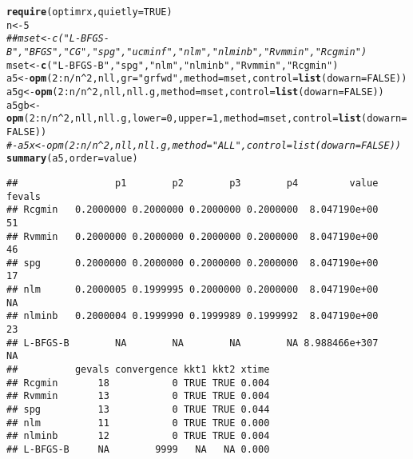 \documentclass[11pt]{article}\usepackage[]{graphicx}\usepackage[]{color}
\makeatletter
\newcommand{\hlnum}[1]{\textcolor[rgb]{0.686,0.059,0.569}{#1}}%
\newcommand{\hlstr}[1]{\textcolor[rgb]{0.192,0.494,0.8}{#1}}%
\newcommand{\hlcom}[1]{\textcolor[rgb]{0.678,0.584,0.686}{\textit{#1}}}%
\newcommand{\hlopt}[1]{\textcolor[rgb]{0,0,0}{#1}}%
\newcommand{\hlstd}[1]{\textcolor[rgb]{0.345,0.345,0.345}{#1}}%
\newcommand{\hlkwb}[1]{\textcolor[rgb]{0.69,0.353,0.396}{#1}}%
\newcommand{\hlkwc}[1]{\textcolor[rgb]{0.333,0.667,0.333}{#1}}%
\newcommand{\hlkwd}[1]{\textcolor[rgb]{0.737,0.353,0.396}{\textbf{#1}}}%
\newenvironment{kframe}{%
 \def\at@end@of@kframe{}%
 \ifinner\ifhmode%
  \def\at@end@of@kframe{\end{minipage}}%
  \begin{minipage}{\columnwidth}%
 \fi\fi%
 \def\FrameCommand##1{\hskip\@totalleftmargin \hskip-\fboxsep
 \colorbox{shadecolor}{##1}\hskip-\fboxsep
     \hskip-\linewidth \hskip-\@totalleftmargin \hskip\columnwidth}%
 \MakeFramed {\advance\hsize-\width
   \@totalleftmargin\z@ \linewidth\hsize
   \@setminipage}}%
 {\par\unskip\endMakeFramed%
 \at@end@of@kframe}
\newenvironment{knitrout}{}{} %
\makeatother
\begin{document}
\begin{knitrout}\scriptsize
{}\color{fgcolor}\begin{kframe}
\begin{alltt}
\hlkwd{require}\hlstd{(optimrx,} \hlkwc{quietly}\hlstd{=}\hlnum{TRUE}\hlstd{)}
\hlstd{n}\hlkwb{<-}\hlnum{5}
\hlcom{## mset<-c("L-BFGS-B", "BFGS", "CG", "spg", "ucminf", "nlm", "nlminb", "Rvmmin", "Rcgmin")}
\hlstd{mset}\hlkwb{<-}\hlkwd{c}\hlstd{(}\hlstr{"L-BFGS-B"}\hlstd{,} \hlstr{"spg"}\hlstd{,} \hlstr{"nlm"}\hlstd{,} \hlstr{"nlminb"}\hlstd{,} \hlstr{"Rvmmin"}\hlstd{,} \hlstr{"Rcgmin"}\hlstd{)}
\hlstd{a5}\hlkwb{<-}\hlkwd{opm}\hlstd{(}\hlnum{2}\hlopt{:}\hlstd{n}\hlopt{/}\hlstd{n}\hlopt{^}\hlnum{2}\hlstd{, nll,} \hlkwc{gr}\hlstd{=}\hlstr{"grfwd"}\hlstd{,} \hlkwc{method}\hlstd{=mset,} \hlkwc{control}\hlstd{=}\hlkwd{list}\hlstd{(}\hlkwc{dowarn}\hlstd{=}\hlnum{FALSE}\hlstd{))}
\hlstd{a5g}\hlkwb{<-}\hlkwd{opm}\hlstd{(}\hlnum{2}\hlopt{:}\hlstd{n}\hlopt{/}\hlstd{n}\hlopt{^}\hlnum{2}\hlstd{, nll, nll.g,} \hlkwc{method}\hlstd{=mset,} \hlkwc{control}\hlstd{=}\hlkwd{list}\hlstd{(}\hlkwc{dowarn}\hlstd{=}\hlnum{FALSE}\hlstd{))}
\hlstd{a5gb}\hlkwb{<-}\hlkwd{opm}\hlstd{(}\hlnum{2}\hlopt{:}\hlstd{n}\hlopt{/}\hlstd{n}\hlopt{^}\hlnum{2}\hlstd{, nll, nll.g,} \hlkwc{lower}\hlstd{=}\hlnum{0}\hlstd{,} \hlkwc{upper}\hlstd{=}\hlnum{1}\hlstd{,} \hlkwc{method}\hlstd{=mset,} \hlkwc{control}\hlstd{=}\hlkwd{list}\hlstd{(}\hlkwc{dowarn}\hlstd{=}\hlnum{FALSE}\hlstd{))}
\hlcom{#- a5x <- opm(2:n/n^2, nll, nll.g, method="ALL", control=list(dowarn=FALSE))}
\hlkwd{summary}\hlstd{(a5,}\hlkwc{order}\hlstd{=value)}
\end{alltt}
\begin{verbatim}
##                 p1        p2        p3        p4         value fevals
## Rcgmin   0.2000000 0.2000000 0.2000000 0.2000000  8.047190e+00     51
## Rvmmin   0.2000000 0.2000000 0.2000000 0.2000000  8.047190e+00     46
## spg      0.2000000 0.2000000 0.2000000 0.2000000  8.047190e+00     17
## nlm      0.2000005 0.1999995 0.2000000 0.2000000  8.047190e+00     NA
## nlminb   0.2000004 0.1999990 0.1999989 0.1999992  8.047190e+00     23
## L-BFGS-B        NA        NA        NA        NA 8.988466e+307     NA
##          gevals convergence kkt1 kkt2 xtime
## Rcgmin       18           0 TRUE TRUE 0.004
## Rvmmin       13           0 TRUE TRUE 0.004
## spg          13           0 TRUE TRUE 0.044
## nlm          11           0 TRUE TRUE 0.000
## nlminb       12           0 TRUE TRUE 0.004
## L-BFGS-B     NA        9999   NA   NA 0.000
\end{verbatim}

\end{kframe}
\end{knitrout}
\end{document}
